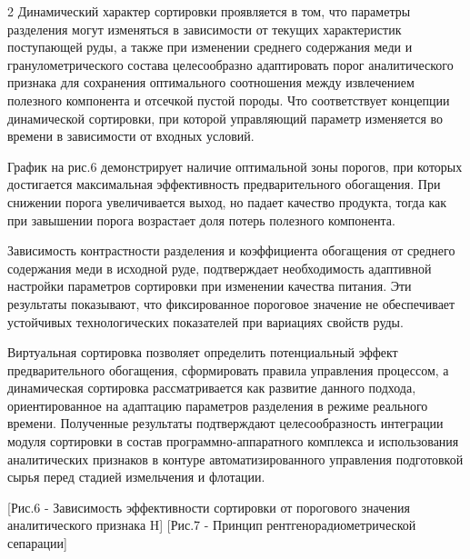 \begin{multicols}{2}
Динамический характер сортировки проявляется в том, что параметры
разделения могут изменяться в зависимости от текущих характеристик
поступающей руды, а также при изменении среднего содержания меди и
гранулометрического состава целесообразно адаптировать порог
аналитического признака для сохранения оптимального соотношения между
извлечением полезного компонента и отсечкой пустой породы. Что
соответствует концепции динамической сортировки, при которой управляющий
параметр изменяется во времени в зависимости от входных условий.

График на рис.6 демонстрирует наличие оптимальной зоны порогов, при
которых достигается максимальная эффективность предварительного
обогащения. При снижении порога увеличивается выход, но падает качество
продукта, тогда как при завышении порога возрастает доля потерь
полезного компонента.

Зависимость контрастности разделения и коэффициента обогащения от
среднего содержания меди в исходной руде, подтверждает необходимость
адаптивной настройки параметров сортировки при изменении качества
питания. Эти результаты показывают, что фиксированное пороговое значение
не обеспечивает устойчивых технологических показателей при вариациях
свойств руды.

Виртуальная сортировка позволяет определить потенциальный эффект
предварительного обогащения, сформировать правила управления процессом,
а динамическая сортировка рассматривается как развитие данного подхода,
ориентированное на адаптацию параметров разделения в режиме реального
времени. Полученные результаты подтверждают целесообразность интеграции
модуля сортировки в состав программно-аппаратного комплекса и
использования аналитических признаков в контуре автоматизированного
управления подготовкой сырья перед стадией измельчения и флотации.
\end{multicols}

\begin{figs}
    [Рис.6 - Зависимость эффективности сортировки от порогового
значения аналитического признака H]
    [Рис.7 - Принцип рентгенорадиометрической сепарации]
\end{figs}

